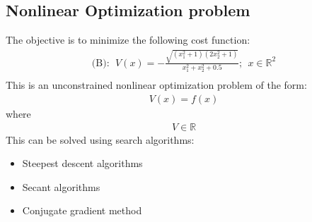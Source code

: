 \subsection{Nonlinear Optimization problem}
The objective is to minimize the following cost function:
\begin{align}
\mbox{(B)} : \ \ V(x) = - \frac{\sqrt{(x_1^2 +1)(2x_2^2 + 1)}}{x_1^2 + x_2^2 + 0.5}; \ \  x \in \mathbb{R}^2 \nonumber \\
\end{align}
This is an unconstrained nonlinear optimization problem of the form:
\begin{align}
    V(x) = f(x)
\end{align}
where 
\begin{align}
    V \in \mathbb{R}
\end{align}
This can be solved using search algorithms: 
\begin{itemize}
    \item Steepest descent algorithms 
    \item Secant algorithms
    \item Conjugate gradient method 
\end{itemize}
